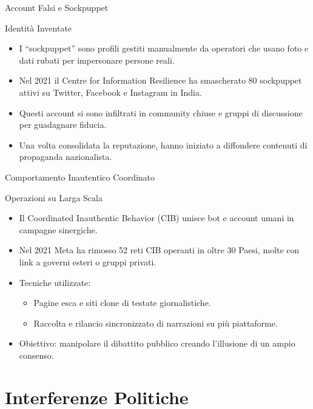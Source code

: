 \documentclass[12pt]{beamer}
\begin{document}
\begin{frame}{Account Falsi e Sockpuppet}
  \small
  \begin{alertblock}{Identità Inventate}
    \begin{itemize}
      \item I “sockpuppet” sono profili gestiti manualmente da operatori che usano foto e dati rubati per impersonare persone reali.
      \item Nel 2021 il Centre for Information Resilience ha smascherato 80 sockpuppet attivi su Twitter, Facebook e Instagram in India.\cite{cir2021_sockpuppet}\cite{bbc_fake_sikh}
      \item Questi account si sono infiltrati in community chiuse e gruppi di discussione per guadagnare fiducia.
      \item Una volta consolidata la reputazione, hanno iniziato a diffondere contenuti di propaganda nazionalista.
    \end{itemize}
  \end{alertblock}
\end{frame}

\begin{frame}{Comportamento Inautentico Coordinato}
  \small
  \begin{alertblock}{Operazioni su Larga Scala}
    \begin{itemize}
      \item Il Coordinated Inauthentic Behavior (CIB) unisce bot e account umani in campagne sinergiche.
      \item Nel 2021 Meta ha rimosso 52 reti CIB operanti in oltre 30 Paesi, molte con link a governi esteri o gruppi privati.\cite{meta_report}\cite{dfrlab_briefing}
      \item Tecniche utilizzate:
        \begin{itemize}
          \item Pagine esca e siti clone di testate giornalistiche.  
          \item Raccolta e rilancio sincronizzato di narrazioni su più piattaforme.
        \end{itemize}
      \item Obiettivo: manipolare il dibattito pubblico creando l’illusione di un ampio consenso.
    \end{itemize}
  \end{alertblock}
\end{frame}


\section{Interferenze Politiche}
\end{document}
